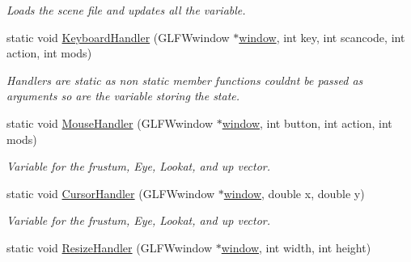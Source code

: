 \begin{DoxyCompactItemize}
\begin{DoxyCompactList}\small\item\em Loads the scene file and updates all the variable. \end{DoxyCompactList}\item 
static void \hyperlink{classcft_1_1Scene_a9752847202079b0f50548fc3a00ab459}{Keyboard\+Handler} (G\+L\+F\+Wwindow $\ast$\hyperlink{classcft_1_1Scene_a5743ac5a5872b962da380e6b8262a347}{window}, int key, int scancode, int action, int mods)\hypertarget{classcft_1_1Scene_a9752847202079b0f50548fc3a00ab459}{}\label{classcft_1_1Scene_a9752847202079b0f50548fc3a00ab459}

\begin{DoxyCompactList}\small\item\em Handlers are static as non static member functions couldn\textquotesingle{}t be passed as arguments so are the variable storing the state. \end{DoxyCompactList}\item 
static void \hyperlink{classcft_1_1Scene_aaa02e5aeb0097c1a39a66880a467c1e3}{Mouse\+Handler} (G\+L\+F\+Wwindow $\ast$\hyperlink{classcft_1_1Scene_a5743ac5a5872b962da380e6b8262a347}{window}, int button, int action, int mods)\hypertarget{classcft_1_1Scene_aaa02e5aeb0097c1a39a66880a467c1e3}{}\label{classcft_1_1Scene_aaa02e5aeb0097c1a39a66880a467c1e3}

\begin{DoxyCompactList}\small\item\em Variable for the frustum, Eye, Lookat, and up vector. \end{DoxyCompactList}\item 
static void \hyperlink{classcft_1_1Scene_ab95660d6aa71906634bb7ee61c6c00d1}{Cursor\+Handler} (G\+L\+F\+Wwindow $\ast$\hyperlink{classcft_1_1Scene_a5743ac5a5872b962da380e6b8262a347}{window}, double x, double y)\hypertarget{classcft_1_1Scene_ab95660d6aa71906634bb7ee61c6c00d1}{}\label{classcft_1_1Scene_ab95660d6aa71906634bb7ee61c6c00d1}

\begin{DoxyCompactList}\small\item\em Variable for the frustum, Eye, Lookat, and up vector. \end{DoxyCompactList}\item 
static void \hyperlink{classcft_1_1Scene_afd4f95d4aa28a930f464f282fdbeb6ac}{Resize\+Handler} (G\+L\+F\+Wwindow $\ast$\hyperlink{classcft_1_1Scene_a5743ac5a5872b962da380e6b8262a347}{window}, int width, int height)\hypertarget{classcft_1_1Scene_afd4f95d4aa28a930f464f282fdbeb6ac}{}\label{classcft_1_1Scene_afd4f95d4aa28a930f464f282fdbeb6ac}


\end{DoxyCompactItemize}
